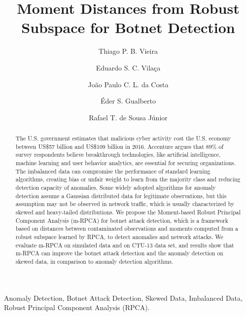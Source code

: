 \documentclass[review]{elsarticle}
\begin{document}
\begin{frontmatter}

\title{Moment Distances from Robust Subspace for Botnet Detection}

\author[unbaddress]{Thiago P. B. Vieira}
\author[unbaddress]{Eduardo S. C. Vilaça}
\author[unbaddress,Ilmenauaddress,Fraunhoferaddress]{João Paulo C. L. da Costa}
\author[unbaddress]{Éder S. Gualberto}
\author[unbaddress]{Rafael T. de Sousa Júnior}

\address[unbaddress]{Department of Electrical Engineering, University of Brasilia (UnB), 70910-900, Brasília-DF, Brazil}
\address[Ilmenauaddress]{Institute for Information Technology, Ilmenau University of Technology, Ilmenau, Germany}
\address[Fraunhoferaddress]{Fraunhofer Institute for Integrated Circuits IIS, Erlangen, Germany}


\begin{abstract}
The U.S. government estimates that malicious cyber activity cost the U.S. economy between US\$57 billion and US\$109 billion in 2016. Accenture argues that 89\% of survey respondents believe breakthrough technologies, like artificial intelligence, machine learning and user behavior analytics, are essential for securing organizations. The imbalanced data can compromise the performance of standard learning algorithms, creating bias or unfair weight to learn from the majority class and reducing detection capacity of anomalies. Some widely adopted algorithms for anomaly detection assume a Gaussian distributed data for legitimate observations, but this assumption may not be observed in network traffic, which is usually characterized by skewed and heavy-tailed distributions. We propose the Moment-based Robust Principal Component Analysis (m-RPCA) for botnet attack detection, which is a framework based on distances between contaminated observations and moments computed from a robust subspace learned by RPCA, to detect anomalies and network attacks. We evaluate m-RPCA on simulated data and on CTU-13 data set, and results show that m-RPCA can improve the botnet attack detection and the anomaly detection on skewed data, in comparison to anomaly detection algorithms.
\end{abstract}

\begin{keyword}
Anomaly Detection, Botnet Attack Detection, Skewed Data, Imbalanced Data, Robust Principal Component Analysis (RPCA).
\end{keyword}

\end{frontmatter}
\end{document}
